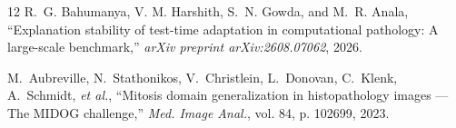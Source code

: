 \documentclass[conference]{IEEEtran}
\begin{document}
\begin{thebibliography}{12}
R.~G. Bahumanya, V. M. Harshith, S.~N. Gowda, and M.~R. Anala, ``Explanation stability of test-time adaptation in computational pathology: A large-scale benchmark,'' \textit{arXiv preprint arXiv:2608.07062}, 2026.

M.~Aubreville, N.~Stathonikos, V.~Christlein, L.~Donovan, C.~Klenk, A.~Schmidt, \textit{et al.}, ``Mitosis domain generalization in histopathology images --- The {MIDOG} challenge,'' \textit{Med. Image Anal.}, vol. 84, p. 102699, 2023.
\end{thebibliography}
\end{document}
